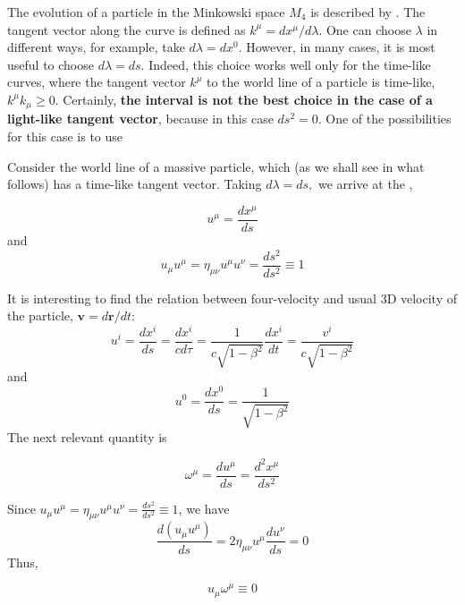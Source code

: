 The evolution of a particle in the Minkowski space $M_{4}$ is described by . The tangent vector along the curve is defined as $k^{\mu}=d x^{\mu} / d \lambda .$ One can choose $\lambda$ in different ways, for example, take $d \lambda=d x^{0} .$ However, in many cases, it is most useful to choose $d \lambda=d s .$ Indeed, this choice works well only for the time-like curves, where the tangent vector $k^{\mu}$ to the world line of a particle is time-like, $k^{\mu} k_{\mu} \geq 0 .$ Certainly, \textbf{the interval is not the best choice in the case of a light-like tangent vector}, because in this case $d s^{2}=0 .$ One of the possibilities for this case is to use 

Consider the world line of a massive particle, which (as we shall see in what follows) has a time-like tangent vector. Taking $d \lambda=d s,$ we arrive at the ,
\begin{qt}
    \begin{equation}
u^{\mu}=\frac{d x^{\mu}}{d s}
\end{equation}
and
\begin{equation}
u_{\mu} u^{\mu}=\eta_{\mu \nu} u^{\mu} u^{\nu}=\frac{d s^{2}}{d s^{2}} \equiv 1
\end{equation}
\end{qt}
It is interesting to find the relation between four-velocity and usual 3D velocity of
the particle, $\mathbf{v}=d\mathbf{r}/dt$:
\begin{equation}
u^{i}=\frac{d x^{i}}{d s}=\frac{d x^{i}}{c d \tau}=\frac{1}{c \sqrt{1-\beta^{2}}} \frac{d x^{i}}{d t}=\frac{v^{i}}{c \sqrt{1-\beta^{2}}}
\label{relativistic-ui}
\end{equation}
and 
\begin{equation}
u^{0}=\frac{d x^{0}}{d s}=\frac{1}{\sqrt{1-\beta^{2}}}
\label{relativistic-u0}
\end{equation}
The next relevant quantity is 
\begin{qt}
    \begin{equation}
\omega^{\mu}=\frac{d u^{\mu}}{d s}=\frac{d^{2} x^{\mu}}{d s^{2}}
\end{equation}
\end{qt}
Since $u_{\mu} u^{\mu}=\eta_{\mu \nu} u^{\mu} u^{\nu}=\frac{d s^{2}}{d s^{2}} \equiv 1$, we have
$$
\frac{d(u_{\mu} u^{\mu})}{ds}=2\eta_{\mu\nu}u^{\mu}\frac{du^{\nu}}{ds}=0
$$
Thus,
\begin{qt}
    \begin{equation}
u_{\mu} \omega^{\mu} \equiv 0
\end{equation}
\end{qt}
